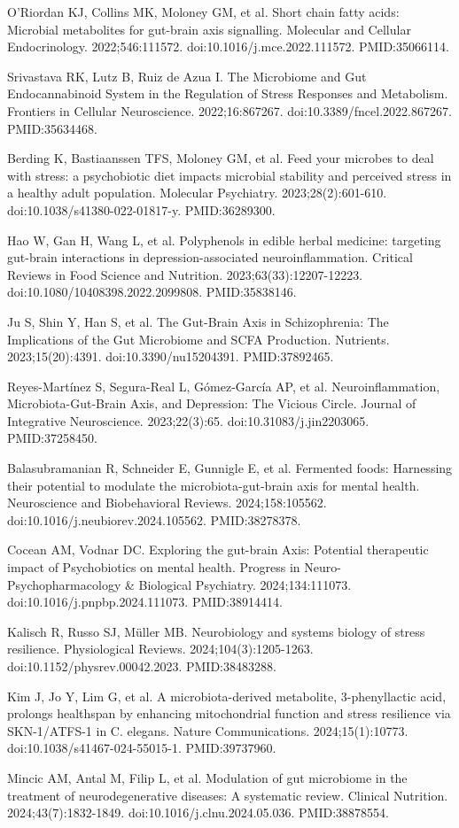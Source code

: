 \documentclass[11pt,oneside]{book}
\newcommand{\reff}[2]{\par\hangindent=7mm\hangafter=1\noindent[#1]\hspace{2mm}#2\par}
\begin{document}
\reff{20}{O'Riordan KJ, Collins MK, Moloney GM, et al. Short chain fatty acids: Microbial metabolites for gut-brain axis signalling. Molecular and Cellular Endocrinology. 2022;546:111572. doi:10.1016/j.mce.2022.111572. PMID:35066114.}
\reff{21}{Srivastava RK, Lutz B, Ruiz de Azua I. The Microbiome and Gut Endocannabinoid System in the Regulation of Stress Responses and Metabolism. Frontiers in Cellular Neuroscience. 2022;16:867267. doi:10.3389/fncel.2022.867267. PMID:35634468.}
\reff{22}{Berding K, Bastiaanssen TFS, Moloney GM, et al. Feed your microbes to deal with stress: a psychobiotic diet impacts microbial stability and perceived stress in a healthy adult population. Molecular Psychiatry. 2023;28(2):601-610. doi:10.1038/s41380-022-01817-y. PMID:36289300.}
\reff{23}{Hao W, Gan H, Wang L, et al. Polyphenols in edible herbal medicine: targeting gut-brain interactions in depression-associated neuroinflammation. Critical Reviews in Food Science and Nutrition. 2023;63(33):12207-12223. doi:10.1080/10408398.2022.2099808. PMID:35838146.}
\reff{24}{Ju S, Shin Y, Han S, et al. The Gut-Brain Axis in Schizophrenia: The Implications of the Gut Microbiome and SCFA Production. Nutrients. 2023;15(20):4391. doi:10.3390/nu15204391. PMID:37892465.}
\reff{25}{Reyes-Martínez S, Segura-Real L, Gómez-García AP, et al. Neuroinflammation, Microbiota-Gut-Brain Axis, and Depression: The Vicious Circle. Journal of Integrative Neuroscience. 2023;22(3):65. doi:10.31083/j.jin2203065. PMID:37258450.}
\reff{26}{Balasubramanian R, Schneider E, Gunnigle E, et al. Fermented foods: Harnessing their potential to modulate the microbiota-gut-brain axis for mental health. Neuroscience and Biobehavioral Reviews. 2024;158:105562. doi:10.1016/j.neubiorev.2024.105562. PMID:38278378.}
\reff{27}{Cocean AM, Vodnar DC. Exploring the gut-brain Axis: Potential therapeutic impact of Psychobiotics on mental health. Progress in Neuro-Psychopharmacology \& Biological Psychiatry. 2024;134:111073. doi:10.1016/j.pnpbp.2024.111073. PMID:38914414.}
\reff{28}{Kalisch R, Russo SJ, Müller MB. Neurobiology and systems biology of stress resilience. Physiological Reviews. 2024;104(3):1205-1263. doi:10.1152/physrev.00042.2023. PMID:38483288.}
\reff{29}{Kim J, Jo Y, Lim G, et al. A microbiota-derived metabolite, 3-phenyllactic acid, prolongs healthspan by enhancing mitochondrial function and stress resilience via SKN-1/ATFS-1 in C. elegans. Nature Communications. 2024;15(1):10773. doi:10.1038/s41467-024-55015-1. PMID:39737960.}
\reff{30}{Mincic AM, Antal M, Filip L, et al. Modulation of gut microbiome in the treatment of neurodegenerative diseases: A systematic review. Clinical Nutrition. 2024;43(7):1832-1849. doi:10.1016/j.clnu.2024.05.036. PMID:38878554.}
\end{document}
